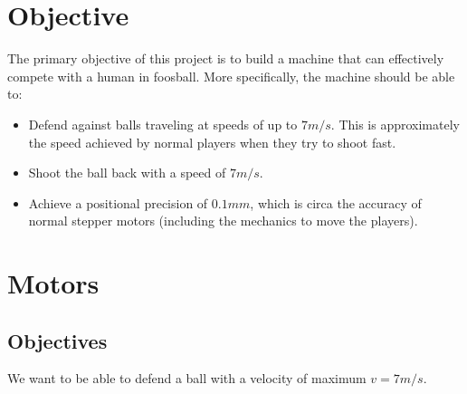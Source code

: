\section{Objective}\label{sec:objective}

The primary objective of this project is to build a machine that can effectively compete with a human in foosball.
More specifically, the machine should be able to:

\begin{itemize}
    \item Defend against balls traveling at speeds of up to $7m/s$.
    This is approximately the speed achieved by normal players when they try to shoot fast.
    \item Shoot the ball back with a speed of $7m/s$.
    \item Achieve a positional precision of $0.1mm$, which is circa the accuracy of normal stepper motors (including the mechanics to move the players).
\end{itemize}


\section{Motors}\label{sec:motors}

\subsection{Objectives}\label{subsec:objectives}
We want to be able to defend a ball with a velocity of maximum $v=7m/s$.

